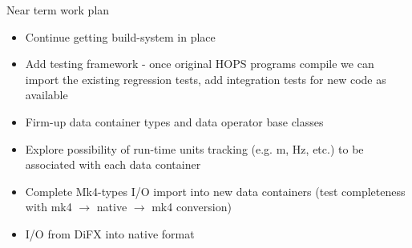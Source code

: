 \documentclass[xcolor=svgnames]{beamer}
\begin{document}
\begin{frame}{Near term work plan}
 
 \begin{itemize}
  \item Continue getting build-system in place
  \item Add testing framework - once original HOPS programs compile we can import the existing regression tests, add integration tests for new code as available
  \item Firm-up data container types and data operator base classes
  \item Explore possibility of run-time units tracking (e.g. m, Hz, etc.) to be associated with each data container
  \item Complete Mk4-types I/O import into new data containers (test completeness with mk4 $\rightarrow$ native $\rightarrow$ mk4 conversion)
  \item I/O from DiFX into native format
 \end{itemize}

 
\end{frame}
\end{document}
